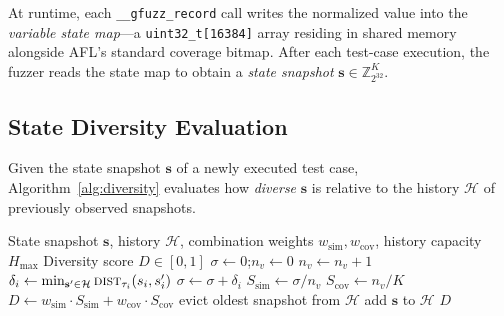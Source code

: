 \documentclass[preprint,12pt,3p]{elsarticle}
\begin{document}
At runtime, each \texttt{\_\_gfuzz\_record} call writes the normalized value
into the \emph{variable state map}---a \texttt{uint32\_t[16384]} array
residing in shared memory alongside AFL's standard coverage bitmap.  After
each test-case execution, the fuzzer reads the state map to obtain a
\emph{state snapshot} $\mathbf{s} \in \mathbb{Z}_{2^{32}}^{K}$.

\subsection{State Diversity Evaluation}
\label{sec:diversity}

Given the state snapshot $\mathbf{s}$ of a newly executed test case,
Algorithm~\ref{alg:diversity} evaluates how \emph{diverse} $\mathbf{s}$ is
relative to the history $\mathcal{H}$ of previously observed snapshots.

\begin{algorithm}[t]
\caption{State Diversity Evaluation}
\label{alg:diversity}
\begin{algorithmic}[1]
\Require State snapshot $\mathbf{s}$, history $\mathcal{H}$,
         combination weights $w_{\text{sim}},w_{\text{cov}}$,
         history capacity $H_{\max}$
\Ensure Diversity score $D \in [0,1]$
\State $\sigma \leftarrow 0$;\quad $n_v \leftarrow 0$
\For{each variable index $i \in [0, K)$}
    \State $n_v \leftarrow n_v + 1$
    \State $\delta_i \leftarrow \min_{\mathbf{s}' \in \mathcal{H}}
      \textsc{dist}_{\tau_i}(s_i, s'_i)$
    \State $\sigma \leftarrow \sigma + \delta_i$
  \EndIf
\EndFor
\State $S_{\text{sim}} \leftarrow \sigma / n_v$
\State $S_{\text{cov}} \leftarrow n_v / K$
\State $D \leftarrow w_{\text{sim}} \cdot S_{\text{sim}} +
  w_{\text{cov}} \cdot S_{\text{cov}}$
  evict oldest snapshot from $\mathcal{H}$
\EndIf
\State add $\mathbf{s}$ to $\mathcal{H}$
\State \Return $D$
\end{algorithmic}
\end{algorithm}
\end{document}
